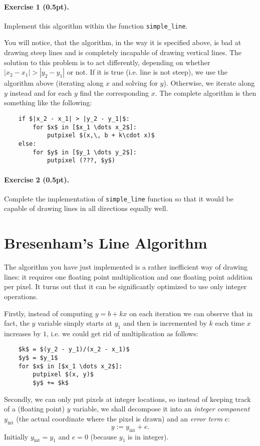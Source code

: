 \documentclass{article}
\newenvironment{exercise}[2]{\paragraph{Exercise #1 (#2pt).} }{\medskip}
\begin{document}
\begin{exercise}{1}{0.5}
Implement this algorithm within the function \verb#simple_line#.
\end{exercise}

You will notice, that the algorithm, in the way it is specified above, is bad at drawing steep lines and is completely incapable of drawing vertical lines. The solution to this problem is to act differently, depending on whether $|x_2 - x_1| > |y_2 - y_1|$ or not. If it is true (i.e. line is not steep), we use the algorithm above (iterating along $x$ and solving for $y$). Otherwise, we iterate along $y$ instead and for each $y$ find the corresponding $x$. The complete algorithm is then something like the following:
\begin{lstlisting}
	if $|x_2 - x_1| > |y_2 - y_1|$:
		for $x$ in [$x_1 \dots x_2$]:
 			putpixel $(x,\, b + k\cdot x)$
	else:
		for $y$ in [$y_1 \dots y_2$]:
			putpixel (???, $y$)
\end{lstlisting}

\begin{exercise}{2}{0.5}
Complete the implementation of \verb#simple_line# function so that it would be capable of drawing lines in all directions equally well.
\end{exercise}

\newpage
\section{Bresenham's Line Algorithm}
The algorithm you have just implemented is a rather inefficient way of drawing lines: it requires one floating point multiplication and one floating point addition per pixel. It turns out that it can be significantly optimized to use only integer operations.

Firstly, instead of computing $y = b + kx$ on each iteration we can observe that in fact, the $y$ variable simply starts at $y_1$ and then is incremented by $k$ each time $x$ increases by $1$, i.e. we could get rid of multiplication as follows:
\begin{lstlisting}
	$k$ = $(y_2 - y_1)/(x_2 - x_1)$
	$y$ = $y_1$
	for $x$ in [$x_1 \dots x_2$]:
 		putpixel $(x, y)$
		$y$ += $k$
\end{lstlisting}

Secondly, we can only put pixels at integer locations, so instead of keeping track of a (floating point) $y$ variable, we shall decompose it into an \emph{integer component} $y_{\mathrm{int}}$ (the actual coordinate where the pixel is drawn) and an \emph{error term} $e$:
$$
 y := y_\mathrm{int} + e.
$$ 
Initially $y_\mathrm{int} = y_1$ and $e=0$ (because $y_1$ is in integer).
\end{document}
